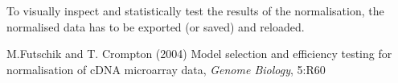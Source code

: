 \documentclass[a4paper,11pt]{article}
\begin{document}
To visually inspect and statistically test 
the results of the normalisation, the normalised data has to be exported (or saved) and reloaded. 

\begin{thebibliography}{99}
 M.Futschik and T. Crompton (2004) Model selection and efficiency testing for normalisation of cDNA microarray data, \emph{Genome Biology}, 5:R60  


\end{thebibliography}
\end{document}

